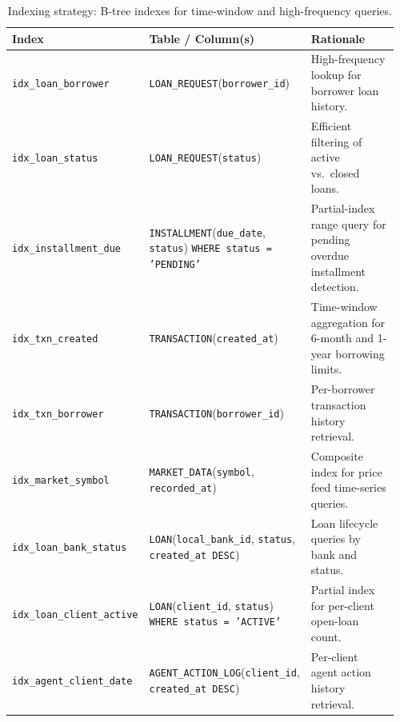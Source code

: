 \documentclass[12pt,a4paper]{report}
\newcommand{\tableheadcolor}{\rowcolor{TableHeadBg}}
\begin{document}
\begin{table}[H]
\centering
\caption[Indexing strategy]{Indexing strategy: B-tree indexes for time-window and high-frequency queries.}
\label{tab:indexing-strategy}
\begingroup
\footnotesize
\setlength{\tabcolsep}{4pt}
\renewcommand{\arraystretch}{1.2}
\begin{tabular}{@{}%
  >{\raggedright\arraybackslash}p{0.19\linewidth}%
  >{\raggedright\arraybackslash}p{0.41\linewidth}%
  >{\raggedright\arraybackslash}p{0.36\linewidth}@{}}
\toprule
\tableheadcolor
\textbf{Index} & \textbf{Table / Column(s)} & \textbf{Rationale} \\
\midrule
\texttt{idx\_loan\_borrower} &
  \texttt{LOAN\_REQUEST}(\texttt{borrower\_id}) &
  High-frequency lookup for borrower loan history. \\
\texttt{idx\_loan\_status} &
  \texttt{LOAN\_REQUEST}(\texttt{status}) &
  Efficient filtering of active vs.\ closed loans. \\
\texttt{idx\_installment\_due} &
  \texttt{INSTALLMENT}(\texttt{due\_date}, \texttt{status})\newline
  \texttt{WHERE status = 'PENDING'} &
  Partial-index range query for pending overdue installment detection. \\
\texttt{idx\_txn\_created} &
  \texttt{TRANSACTION}(\texttt{created\_at}) &
  Time-window aggregation for 6-month and 1-year borrowing limits. \\
\texttt{idx\_txn\_borrower} &
  \texttt{TRANSACTION}(\texttt{borrower\_id}) &
  Per-borrower transaction history retrieval. \\
\texttt{idx\_market\_symbol} &
  \texttt{MARKET\_DATA}(\texttt{symbol},\newline
  \texttt{recorded\_at}) &
  Composite index for price feed time-series queries. \\
\texttt{idx\_loan\_bank\_status} &
  \texttt{LOAN}(\texttt{local\_bank\_id}, \texttt{status},\newline
  \texttt{created\_at DESC}) &
  Loan lifecycle queries by bank and status. \\
\texttt{idx\_loan\_client\_active} &
  \texttt{LOAN}(\texttt{client\_id}, \texttt{status})\newline
  \texttt{WHERE status = 'ACTIVE'} &
  Partial index for per-client open-loan count. \\
\texttt{idx\_agent\_client\_date} &
  \texttt{AGENT\_ACTION\_LOG}(\texttt{client\_id},\newline
  \texttt{created\_at DESC}) &
  Per-client agent action history retrieval. \\

\end{tabular}
\end{table}
\end{document}
